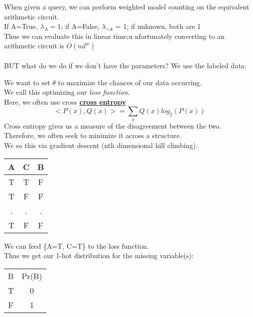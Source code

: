 \documentclass[../../lecture_notes.tex]{subfiles}
\begin{document}
When given a query, we can perform weighted model counting on the equivalent arithmetic circuit.\\
\indent If A=True, $\lambda_A = 1$; if A=False, $\lambda_{\neg A}$ = 1; if unknown, both are 1\\
Thus we can evaluate this in linear time;u nfortunately converting to an arithmetic circuit is $O(nd^w)$\\
\\
BUT what do we do if we don’t have the parameters?
We use the labeled data:

We want to set $\theta$ to maximize the chances of our data occurring.\\
We call this optimizing our \textit{loss function}.\\
Here, we often use cross \textbf{\underline{cross entropy}}\begin{equation*}
	<P(x), Q(x)> = \sum_x Q(x) log_2(P(x))\end{equation*}
Cross entropy gives us a measure of the disagreement between the two.\\
\indent Therefore, we often seek to minimize it across a structure.\\
We so this via gradient descent (nth dimensional hill climbing).\\

\begin{minipage}{0.3\linewidth}
\begin{center}\begin{tabular} { | c c c | }\hline A & C & B\\\hline T & T & F\\T & F & F\\. & . & .\\T & F & F\\\hline\end{tabular}\end{center}
\end{minipage}%
\begin{minipage}{0.7\linewidth}
We can feed \{A=T, C=T\} to the loss function. \\
Thus we get our 1-hot distribution for the missing variable(s):
\begin{center}\begin{tabular} { | c | c | }\hline B & Pr(B)\\T & 0\\F & 1\\\hline \end{tabular}\end{center}
\end{minipage}\medskip
\end{document}
